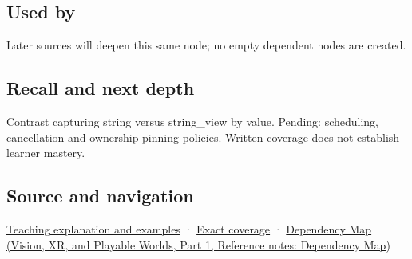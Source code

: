 \subsection{Used by}\label{appendix-aea529eb5175-used-by}

\hypertarget{appendix-aea529eb5175-used-by}{}

Later sources will deepen this same node; no empty dependent nodes are created.

\subsection{Recall and next depth}\label{appendix-aea529eb5175-recall-and-next-depth}

\hypertarget{appendix-aea529eb5175-recall-and-next-depth}{}

Contrast capturing string versus string\_view by value. Pending: scheduling, cancellation and ownership-pinning policies. Written coverage does not establish learner mastery.

\subsection{Source and navigation}\label{appendix-aea529eb5175-source-and-navigation}

\hypertarget{appendix-aea529eb5175-source-and-navigation}{}

\hyperref[01-foundations-i-ch003-borrowed-views-and-deferred-work-need-an-owner-story]{Teaching explanation and examples} · \hyperref[appendix-fd090d982a15-m008---parts-113-126]{Exact coverage} · \href{../07-Vision-XR-and-Playable-Worlds-P01/main.pdf\#nameddest=appendix-4ad47bdd269a}{Dependency Map (Vision, XR, and Playable Worlds, Part 1, Reference notes: Dependency Map)}
